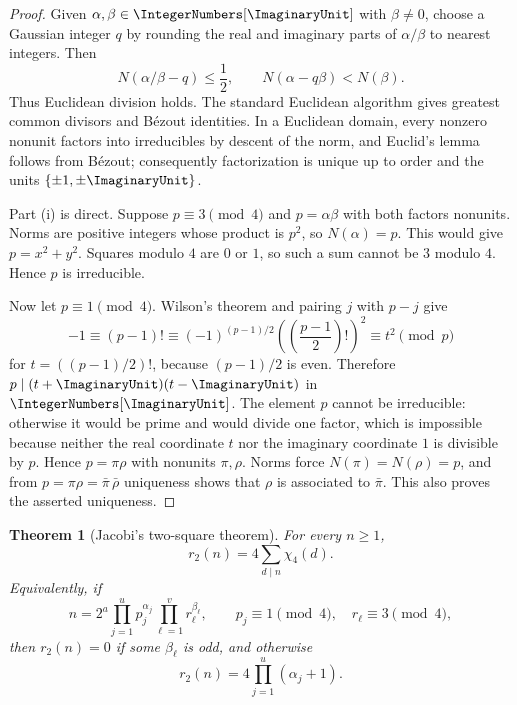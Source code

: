 \documentclass[11pt,oneside]{article}
\newtheorem{theorem}{Theorem}[section]
\theoremstyle{definition}
\begin{document}
\begin{proof}
Given $\alpha,\beta\in\IntegerNumbers[\ImaginaryUnit]$ with $\beta\ne0$, choose a Gaussian integer
$q$ by rounding the real and imaginary parts of $\alpha/\beta$ to nearest
integers.  Then
\[
 N(\alpha/\beta-q)\le \frac12,
 \qquad
 N(\alpha-q\beta)<N(\beta).
\]
Thus Euclidean division holds.  The standard Euclidean algorithm gives
greatest common divisors and B\'ezout identities.  In a Euclidean domain,
every nonzero nonunit factors into irreducibles by descent of the norm, and
Euclid's lemma follows from B\'ezout; consequently factorization is unique
up to order and the units $\{\pm1,\pm\ImaginaryUnit\}$.

Part (i) is direct.  Suppose $p\equiv3\pmod4$ and $p=\alpha\beta$ with
both factors nonunits.  Norms are positive integers whose product is $p^2$,
so $N(\alpha)=p$.  This would give $p=x^2+y^2$.  Squares modulo $4$ are
$0$ or $1$, so such a sum cannot be $3$ modulo $4$.  Hence $p$ is
irreducible.

Now let $p\equiv1\pmod4$.  Wilson's theorem and pairing $j$ with $p-j$
give
\[
 -1\equiv(p-1)!
 \equiv(-1)^{(p-1)/2}\left(\left(\frac{p-1}{2}\right)!\right)^2
 \equiv t^2\pmod p
\]
for $t=((p-1)/2)!$, because $(p-1)/2$ is even.  Therefore
$p\mid(t+\ImaginaryUnit)(t-\ImaginaryUnit)$ in $\IntegerNumbers[\ImaginaryUnit]$.  The element $p$ cannot be irreducible:
otherwise it would be prime and would divide one factor, which is
impossible because neither the real coordinate $t$ nor the imaginary
coordinate $1$ is divisible by $p$.  Hence $p=\pi\rho$ with nonunits
$\pi,\rho$.  Norms force $N(\pi)=N(\rho)=p$, and from
$p=\pi\rho=\bar\pi\,\bar\rho$ uniqueness shows that $\rho$ is associated
to $\bar\pi$.  This also proves the asserted uniqueness.
\end{proof}

\begin{theorem}[Jacobi's two-square theorem]\label{thm:two-square}
For every $n\ge1$,
\begin{equation}\label{eq:two-square}
 r_2(n)=4\sum_{d\mid n}\chi_4(d).
\end{equation}
Equivalently, if
\[
 n=2^a\prod_{j=1}^{u}p_j^{\alpha_j}
       \prod_{\ell=1}^{v}r_\ell^{\beta_\ell},
 \qquad
 p_j\equiv1\pmod4,\quad r_\ell\equiv3\pmod4,
\]
then $r_2(n)=0$ if some $\beta_\ell$ is odd, and otherwise
\[
 r_2(n)=4\prod_{j=1}^{u}(\alpha_j+1).
\]
\end{theorem}
\end{document}

